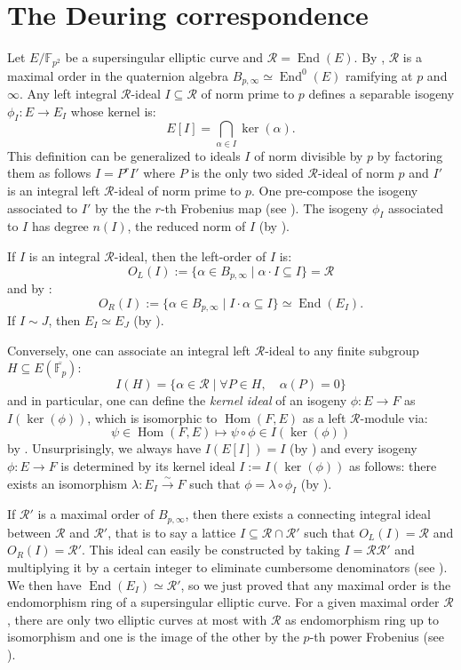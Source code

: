 \documentclass[a4paper,10pt,notitlepage]{report}
\theoremstyle{definition}
\theoremstyle{plain}
\theoremstyle{definition}
\newcommand{\F}{\mathbb{F}}
\newcommand{\m}[1]{\mathcal{#1}}
\renewcommand{\(}{\left(}
\renewcommand{\)}{\right)}
\DeclareMathOperator{\Hom}{Hom}
\DeclareMathOperator{\End}{End}
\begin{document}
\section{The Deuring correspondence}\label{Paragraph 2}

Let $E/\F_{p^2}$ be a supersingular elliptic curve and $\m{R}=\End(E)$.  By \cite[Theorem 42.1.9]{Voight}, $\m{R}$ is a maximal order in the quaternion algebra $B_{p,\infty}\simeq\End^0(E)$ ramifying at $p$ and $\infty$. Any left integral $\m{R}$-ideal $I\subseteq \m{R}$ of norm prime to $p$ defines a separable isogeny $\phi_I : E\longrightarrow E_I$ whose kernel is:
\[E[I]=\bigcap_{\alpha\in I}\ker(\alpha).\]
This definition can be generalized to ideals $I$ of norm divisible by $p$ by factoring them as follows $I=P^r I'$ where $P$ is the only two sided $\m{R}$-ideal of norm $p$ and $I'$ is an integral left $\m{R}$-ideal of norm prime to $p$.  One pre-compose the isogeny associated to $I'$ by the the $r$-th Frobenius map (see \cite[42.2.4]{Voight}).  The isogeny $\phi_I$ associated to $I$ has degree $n(I)$, the reduced norm of $I$ (by \cite[Proposition 42.2.16.(a)]{Voight}).

If $I$ is an integral $\m{R}$-ideal, then the left-order of $I$ is: 
\[O_L(I):=\{\alpha\in B_{p,\infty}\mid \alpha\cdot I \subseteq I\}=\m{R}\]
and by \cite[Lemma 42.2.9]{Voight}:
\[O_R(I):=\{\alpha\in B_{p,\infty}\mid I\cdot\alpha \subseteq I\}\simeq \End(E_I).\]
If $I\sim J$, then $E_I\simeq E_J$ (by \cite[Lemma 42.2.13]{Voight}).

Conversely, one can associate an integral left $\m{R}$-ideal to any finite subgroup $H\subseteq E(\overline{\F_p})$:
\[I(H)=\{\alpha\in\m{R}\mid\forall P\in H, \quad \alpha(P)=0\}\]
and in particular, one can define the \emph{kernel ideal} of an isogeny $\phi : E\longrightarrow F$ as $I(\ker(\phi))$, which is isomorphic to $\Hom(F,E)$ as a left $\m{R}$-module via:
\[\psi\in\Hom(F,E) \longmapsto \psi\circ\phi\in I(\ker(\phi)) \]
by \cite[Lemma 42.2.7]{Voight}. Unsurprisingly, we always have $I(E[I])=I$ (by \cite[Proposition 42.2.16.(b)]{Voight}) and every isogeny $\phi :E\longrightarrow F$ is determined by its kernel ideal $I:=I(\ker(\phi))$ as follows: there exists an isomorphism $\lambda : E_I\overset{\sim}{\longrightarrow} F$ such that $\phi=\lambda\circ\phi_I$ (by \cite[Corollary 42.2.21]{Voight}).

If $\m{R}'$ is a maximal order of $B_{p,\infty}$, then there exists a connecting integral ideal between $\m{R}$ and $\m{R}'$, that is to say a lattice $I\subseteq \m{R}\cap\m{R}'$ such that $O_L(I)=\m{R}$ and $O_R(I)=\m{R}'$. This ideal can easily be constructed by taking $I=\m{R}\m{R}'$ and multiplying it by a certain integer to eliminate cumbersome denominators (see \cite[Lemma 17.4.7]{Voight}). We then have $\End(E_I)\simeq\m{R}'$, so we just proved that any maximal order is the endomorphism ring of a supersingular elliptic curve. For a given maximal order $\m{R}$, there are only two elliptic curves at most with $\m{R}$ as endomorphism ring up to isomorphism and one is the image of the other by the $p$-th power Frobenius (see \cite[Lemma 42.4.1]{Voight}).   
\end{document}
